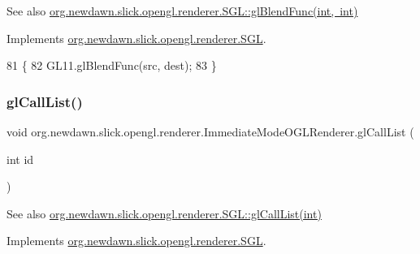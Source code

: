 \begin{DoxySeeAlso}{See also}
\mbox{\hyperlink{interfaceorg_1_1newdawn_1_1slick_1_1opengl_1_1renderer_1_1_s_g_l_afa605b9f35a519c10dbed88c79be96af}{org.\+newdawn.\+slick.\+opengl.\+renderer.\+S\+G\+L\+::gl\+Blend\+Func(int, int)}} 
\end{DoxySeeAlso}


Implements \mbox{\hyperlink{interfaceorg_1_1newdawn_1_1slick_1_1opengl_1_1renderer_1_1_s_g_l_afa605b9f35a519c10dbed88c79be96af}{org.\+newdawn.\+slick.\+opengl.\+renderer.\+S\+GL}}.


\begin{DoxyCode}
81                                                \{
82         GL11.glBlendFunc(src, dest);
83     \}
\end{DoxyCode}
\mbox{\label{classorg_1_1newdawn_1_1slick_1_1opengl_1_1renderer_1_1_immediate_mode_o_g_l_renderer_a30770752ebb5e2bbc31f322368dfa46e}} 
\subsubsection{\texorpdfstring{gl\+Call\+List()}{glCallList()}}
{\footnotesize\ttfamily void org.\+newdawn.\+slick.\+opengl.\+renderer.\+Immediate\+Mode\+O\+G\+L\+Renderer.\+gl\+Call\+List (\begin{DoxyParamCaption}\item[{int}]{id }\end{DoxyParamCaption})\hspace{0.3cm}{\ttfamily [inline]}}

\begin{DoxySeeAlso}{See also}
\mbox{\hyperlink{interfaceorg_1_1newdawn_1_1slick_1_1opengl_1_1renderer_1_1_s_g_l_a8482d9603203e93027e90042db3f561a}{org.\+newdawn.\+slick.\+opengl.\+renderer.\+S\+G\+L\+::gl\+Call\+List(int)}} 
\end{DoxySeeAlso}


Implements \mbox{\hyperlink{interfaceorg_1_1newdawn_1_1slick_1_1opengl_1_1renderer_1_1_s_g_l_a8482d9603203e93027e90042db3f561a}{org.\+newdawn.\+slick.\+opengl.\+renderer.\+S\+GL}}.


